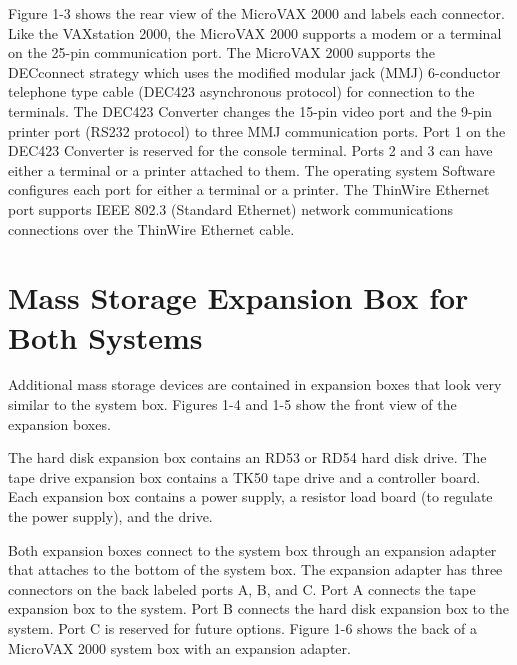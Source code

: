 \documentclass{decsectional}
\begin{document}

\newpage


Figure 1-3 shows the rear view of the MicroVAX 2000 and labels each 
connector. Like the VAXstation 2000, the MicroVAX 2000 supports a modem
or a terminal on the 25-pin communication port. The MicroVAX 2000 
supports the DECconnect strategy which uses the modified modular jack (MMJ)
6-conductor telephone type cable (DEC423 asynchronous protocol) for 
connection to the terminals. The DEC423 Converter changes the 15-pin video
port and the 9-pin printer port (RS232 protocol) to three MMJ communication 
ports. Port 1 on the DEC423 Converter is reserved for the console
terminal. Ports 2 and 3 can have either a terminal or a printer attached to
them. The operating system Software configures each port for either a terminal 
or a printer. The ThinWire Ethernet port supports IEEE 802.3 (Standard
Ethernet) network communications connections over the ThinWire Ethernet
cable.


\section{Mass Storage Expansion Box for Both Systems}

Additional mass storage devices are contained in expansion boxes that look
very similar to the system box. Figures 1-4 and 1-5 show the front view of
the expansion boxes.

The hard disk expansion box contains an RD53 or RD54 hard disk drive.
The tape drive expansion box contains a TK50 tape drive and a controller
board. Each expansion box contains a power supply, a resistor load board
(to regulate the power supply), and the drive.


\newpage


\newpage

Both expansion boxes connect to the system box through an expansion
adapter that attaches to the bottom of the system box. The expansion
adapter has three connectors on the back labeled ports A, B, and C. Port
A connects the tape expansion box to the system. Port B connects the hard
disk expansion box to the system. Port C is reserved for future options. 
Figure 1-6 shows the back of a MicroVAX 2000 system box with an expansion
adapter.
\end{document}
